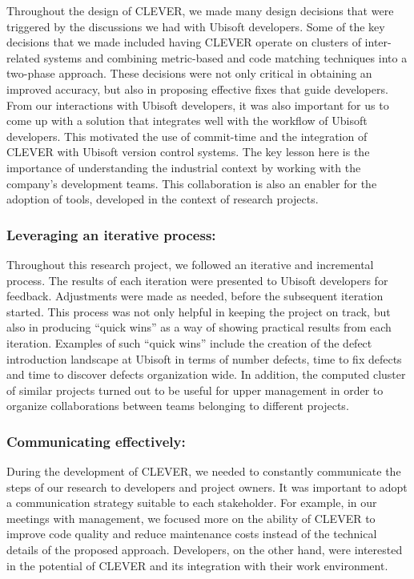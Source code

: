 \documentclass[sigconf]{acmart}
\begin{document}
Throughout the design of CLEVER, we made many design decisions that were
triggered by the discussions we had with Ubisoft developers. Some of the
key decisions that we made included having CLEVER operate on clusters of
inter-related systems and combining metric-based and code matching
techniques into a two-phase approach. These decisions were not only
critical in obtaining an improved accuracy, but also in proposing
effective fixes that guide developers. From our interactions with
Ubisoft developers, it was also important for us to come up with a
solution that integrates well with the workflow of Ubisoft developers.
This motivated the use of commit-time and the integration of CLEVER with
Ubisoft version control systems. The key lesson here is the importance
of understanding the industrial context by working with the company's
development teams. This collaboration is also an enabler for the
adoption of tools, developed in the context of research projects.

\subsubsection{Leveraging an iterative
process:}\label{leveraging-an-iterative-process}

Throughout this research project, we followed an iterative and
incremental process. The results of each iteration were presented to
Ubisoft developers for feedback. Adjustments were made as needed, before
the subsequent iteration started. This process was not only helpful in
keeping the project on track, but also in producing ``quick wins'' as a
way of showing practical results from each iteration. Examples of such
``quick wins'' include the creation of the defect introduction landscape
at Ubisoft in terms of number defects, time to fix defects and time to
discover defects organization wide. In addition, the computed cluster of
similar projects turned out to be useful for upper management in order
to organize collaborations between teams belonging to different
projects.

\subsubsection{Communicating
effectively:}\label{communicating-effectively}

During the development of CLEVER, we needed to constantly communicate
the steps of our research to developers and project owners. It was
important to adopt a communication strategy suitable to each
stakeholder. For example, in our meetings with management, we focused
more on the ability of CLEVER to improve code quality and reduce
maintenance costs instead of the technical details of the proposed
approach. Developers, on the other hand, were interested in the
potential of CLEVER and its integration with their work environment.
\end{document}

